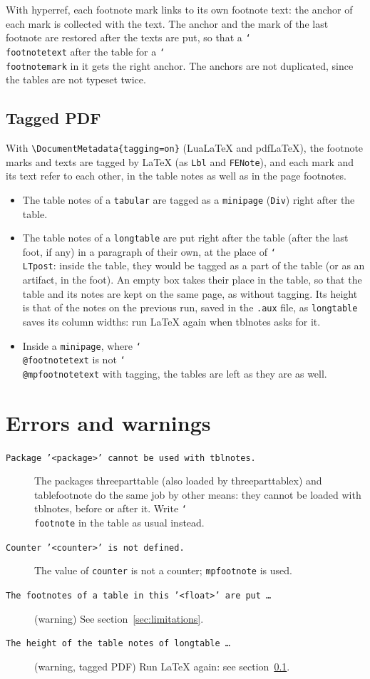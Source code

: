 \documentclass{article}
\newcommand*\cs[1]{\texttt{\char`\\#1}}
\newcommand*\pkg[1]{\textsf{#1}}
\newcommand*\key[1]{\texttt{#1}}
\begin{document}
With \pkg{hyperref}, each footnote mark links to its own footnote text:
the anchor of each mark is collected with the text.  The anchor and the
mark of the last footnote are restored after the texts are put, so that
a \cs{footnotetext} after the table for a \cs{footnotemark} in it gets
the right anchor.  The anchors are not duplicated, since the tables are
not typeset twice.

\subsection{Tagged PDF}\label{sec:tagging}

With \verb|\DocumentMetadata{tagging=on}| (Lua\LaTeX{} and
pdf\LaTeX), the footnote marks and texts are tagged by \LaTeX{} (as
\texttt{Lbl} and \texttt{FENote}), and each mark and its text refer
to each other, in the table notes as well as in the page footnotes.
\begin{itemize}
\item The table notes of a \texttt{tabular} are tagged as a
  \texttt{minipage} (\texttt{Div}) right after the table.
\item The table notes of a \texttt{longtable} are put right after the
  table (after the last foot, if any) in a paragraph of their own, at
  the place of \cs{LTpost}: inside the table, they would be tagged as a
  part of the table (or as an artifact, in the foot).  An empty box
  takes their place in the table, so that the table and its notes are
  kept on the same page, as without tagging.  Its height is that of
  the notes on the previous run, saved in the \texttt{.aux} file, as
  \texttt{longtable} saves its column widths: run \LaTeX{} again when
  \pkg{tblnotes} asks for it.
\item Inside a \texttt{minipage}, where \cs{@footnotetext} is not
  \cs{@mpfootnotetext} with tagging, the tables are left as they are
  as well.
\end{itemize}

\section{Errors and warnings}

\begin{description}
\item[\texttt{Package '<package>' cannot be used with tblnotes.}]
  The packages \pkg{threeparttable} (also loaded by
  \pkg{threeparttablex}) and \pkg{tablefootnote} do the same job by
  other means: they cannot be loaded with \pkg{tblnotes}, before or
  after it.  Write
  \cs{footnote} in the table as usual instead.
\item[\texttt{Counter '<counter>' is not defined.}] The value of
  \key{counter} is not a counter; \texttt{mpfootnote} is used.
\item[\texttt{The footnotes of a table in this '<float>' are put \dots}]
  (warning) See section~\ref{sec:limitations}.
\item[\texttt{The height of the table notes of longtable \dots}]
  (warning, tagged PDF) Run \LaTeX{} again: see
  section~\ref{sec:tagging}.
\end{description}
\end{document}
